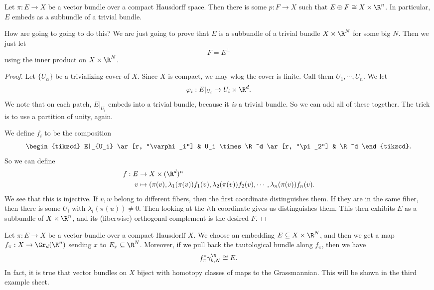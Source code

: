 \documentclass[a4paper]{article}
\begin{document}
\begin{lemma}
  Let $\pi: E \to X$ be a vector bundle over a compact Hausdorff space. Then there is some $p: F \to X$ such that $E \oplus F \cong X \times \R^n$. In particular, $E$ embeds as a subbundle of a trivial bundle.
\end{lemma}

How are going to going to do this? We are just going to prove that $E$ is a subbundle of a trivial bundle $X \times \R^N$ for some big $N$. Then we just let
\[
  F = E^\perp
\]
using the inner product on $X \times \R^N$.

\begin{proof}
  Let $\{U_\alpha\}$ be a trivializing cover of $X$. Since $X$ is compact, we may wlog the cover is finite. Call them $U_1, \cdots, U_n$. We let
  \[
    \varphi_i: E|_{U_i} \to U_i \times \R^d.
  \]
  We note that on each patch, $E|_{U_i}$ embeds into a trivial bundle, because it \emph{is} a trivial bundle. So we can add all of these together. The trick is to use a partition of unity, again.

  We define $f_i$ to be the composition
  \[
    \begin{tikzcd}
      E|_{U_i} \ar[r, "\varphi_i"] & U_i \times \R^d \ar[r, "\pi_2"] & \R^d
    \end{tikzcd}.
  \]
  So we can define
  \begin{align*}
    f: E &\to X \times (\R^d)^n\\
    v&\mapsto (\pi(v), \lambda_1(\pi(v)) f_1(v), \lambda_2(\pi(v)) f_2(v), \cdots, \lambda_n(\pi(v)) f_n(v).
  \end{align*}
  We see that this is injective. If $v, w$ belong to different fibers, then the first coordinate distinguishes them. If they are in the same fiber, then there is some $U_i$ with $\lambda_i(\pi(u)) \not= 0$. Then looking at the $i$th coordinate gives us distinguishes them. This then exhibits $E$ as a subbundle of $X \times \R^n$, and its (fiberwise) orthogonal complement is the desired $F$.
\end{proof}

\begin{cor}
  Let $\pi: E\to X$ be a vector bundle over a compact Hausdorff $X$. We choose an embedding $E \subseteq X \times \R^N$, and then we get a map $f_\pi: X \to \Gr_d (\R^n)$ sending $x$ to $E_x \subseteq \R^N$. Moreover, if we pull back the tautological bundle along $f_\pi$, then we have
  \[
    f_{\pi}^* \gamma_{k, N}^\R \cong E.
  \]
  In fact, it is true that vector bundles on $X$ biject with homotopy classes of maps to the Grassmannian. This will be shown in the third example sheet. %
\end{cor}
\end{document}
